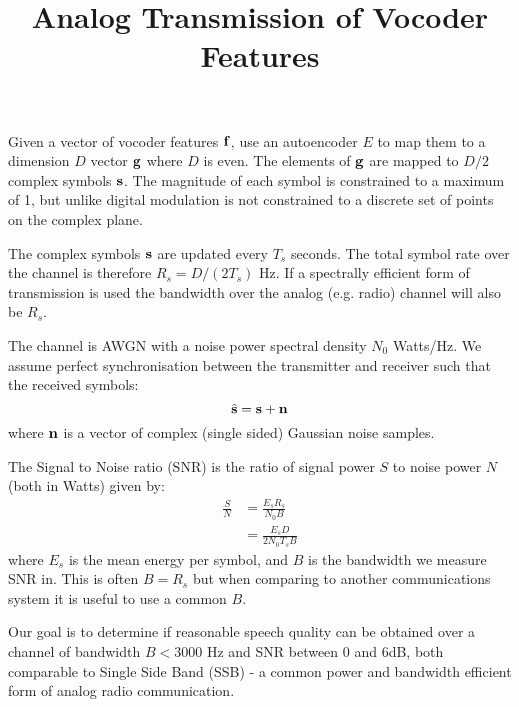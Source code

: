 \documentclass{article}
\begin{document}
\title{Analog Transmission of Vocoder Features}
\maketitle

Given a vector of vocoder features $\bf{f}$, use an autoencoder $E$ to map them to a dimension $D$ vector $\bf{g}$ where $D$ is even. The elements of $\bf{g}$ are mapped to $D/2$ complex symbols $\bf{s}$.  The magnitude of each symbol is constrained to a maximum of 1, but unlike digital modulation is not constrained to a discrete set of points on the complex plane.

The complex symbols $\bf{s}$ are updated every $T_s$ seconds. The total symbol rate over the channel is therefore $R_s = D/(2T_s)$ Hz.  If a spectrally efficient form of transmission is used the bandwidth over the analog (e.g. radio) channel will also be $R_s$.

The channel is AWGN with a noise power spectral density $N_0$ Watts/Hz.  We assume perfect synchronisation between the transmitter and receiver such that the received symbols:
\begin{equation}
\hat{\bf{s}}=\bf{s}+\bf{n}
\end{equation}
where $\bf{n}$ is a vector of complex (single sided) Gaussian noise samples.


The Signal to Noise ratio (SNR) is the ratio of signal power $S$ to noise power $N$ (both in Watts) given by:
\begin{equation}
\begin{split}
\frac{S}{N} &= \frac{E_sR_s}{N_0B} \\
            &= \frac{E_sD}{2N_0T_sB}
\end{split}
\end{equation}
where $E_s$ is the mean energy per symbol, and $B$ is the bandwidth we measure SNR in. This is often $B=R_s$ but when comparing to another communications system it is useful to use a common $B$.

Our goal is to determine if reasonable speech quality can be obtained over a channel of bandwidth $B<3000$ Hz and SNR between 0 and 6dB, both comparable to Single Side Band (SSB) - a common power and bandwidth efficient form of analog radio communication.
\end{document}
